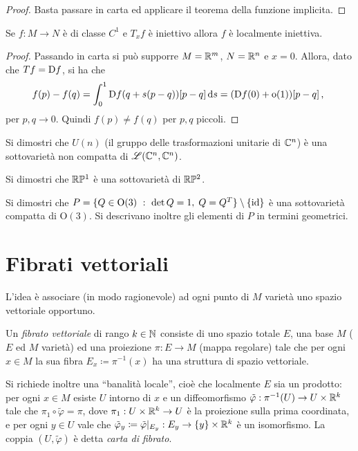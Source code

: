  \begin{proof}
  Basta passare in carta ed applicare il teorema della funzione implicita.
 \end{proof}

\begin{proposition}
	Se $f:M\to N$ è di classe $C^1$ e $T_xf$ è iniettivo allora $f$ è localmente iniettiva.
\end{proposition}

\begin{proof}
	Passando in carta si può supporre $M=\mathbb R^m$, $N=\mathbb R^n$ e $x=0$. Allora, dato che $Tf=\mathrm D f$, si ha che
	\begin{equation*}
	f(p)-f(q)=\int_0^1\mathrm D f(q+s(p-q))[p-q]\,\mathrm d s=(\mathrm D f(0)+\mathrm{o}(1))[p-q]\, \text{, }
	\end{equation*}
	per $p,q\to 0$. Quindi $f(p)\ne f(q)$ per $p,q$ piccoli.
\end{proof}

\begin{exercise}
	Si dimostri che $U(n)$ (il gruppo delle trasformazioni unitarie di $\mathbb C^n$) è una sottovarietà non compatta di $\mathscr L(\mathbb C^n,\mathbb C^n)$.
\end{exercise}
\begin{exercise}
	Si dimostri che $\mathbb R \mathbb P^1$ è una sottovarietà di $\mathbb R \mathbb P^2$.
\end{exercise}
\begin{exercise}
	Si dimostri che $P=\{ Q\in \mathrm O(3)\ :\ \det Q=1,\; Q=Q^T\}\setminus\{\id\}$ è una sottovarietà compatta di $\mathrm O(3)$. Si descrivano inoltre gli elementi di $P$ in termini geometrici.
\end{exercise}



\section{Fibrati vettoriali}

L'idea è associare (in modo ragionevole) ad ogni punto di $M$ varietà uno spazio vettoriale opportuno.

\begin{definition} 
	Un \emph{fibrato vettoriale} di rango $k\in\mathbb N$ consiste di uno spazio totale $E$, una base $M$ ($E$ ed $M$ varietà) ed una proiezione $\pi:E\to M$ (mappa regolare) tale che per ogni $x\in M$ la sua fibra $E_x\coloneqq \pi^{-1}(x)$ ha una struttura di spazio vettoriale.
	
	Si richiede inoltre una ``banalità locale'', cioè che localmente $E$ sia un prodotto: per ogni $x\in M$ esiste $U$ intorno di $x$ e un diffeomorfismo $\tilde\varphi:\pi^{-1}(U)\to U\times \mathbb R^k$ tale che $\pi_1\circ \tilde\varphi = \pi$, dove $\pi_1:U\times \mathbb R^k\to U$ è la proiezione sulla prima coordinata, e per ogni $y\in U$ vale che $\tilde\varphi_y\coloneqq \tilde\varphi|_{E_y}:E_y\to \{y\}\times \mathbb R^k$ è un isomorfismo.
	La coppia $(U,\tilde\varphi)$ è detta \emph{carta di fibrato}.
\end{definition}

